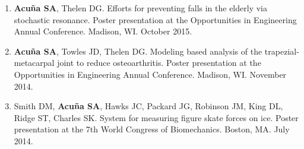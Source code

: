 \documentclass[letterpaper, 10pt]{article}
\begin{document}
\begin{enumerate}
    \item \textbf{Acuña SA}, Thelen DG. Efforts for preventing falls in the elderly via stochastic resonance. Poster presentation at the Opportunities in Engineering Annual Conference. Madison, WI. October 2015.
    \item \textbf{Acuña SA}, Towles JD, Thelen DG. Modeling based analysis of the trapezial-metacarpal joint to reduce osteoarthritis. Poster presentation at the Opportunities in Engineering Annual Conference. Madison, WI. November 2014.
    \item Smith DM, \textbf{Acuña SA}, Hawks JC, Packard JG, Robinson JM, King DL, Ridge ST, Charles SK. System for measuring ﬁgure skate forces on ice. Poster presentation at the 7th World Congress of Biomechanics. Boston, MA. July 2014.
    
\end{enumerate}

\end{document}
